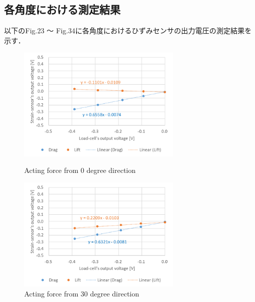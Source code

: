 \documentclass[twocolumn,a4j]{jsarticle}
\begin{document}
\subsection{各角度における測定結果}
以下のFig.23 ～ Fig.34に各角度におけるひずみセンサの出力電圧の測定結果を示す．

\begin{figure}[htbp]
    \footnotesize
    \begin{center}
        \includegraphics[width=78mm]{../images/0.png}
        \caption{Acting force from 0 degree direction}
        \includegraphics[width=78mm]{../images/30.png}
        \caption{Acting force from 30 degree direction}
    \end{center}
\end{figure}
\end{document}

